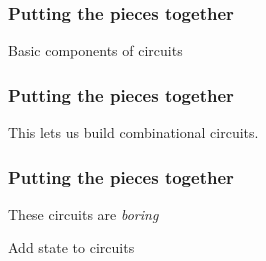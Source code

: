 \begin{frame}
    \frametitle{Putting the pieces together}

    Basic components of circuits

\end{frame}
\begin{frame}
    \frametitle{Putting the pieces together}

    \centering
    This lets us build \alert{combinational} circuits.

\end{frame}
\begin{frame}
    \frametitle{Putting the pieces together}

    \centering
    These circuits are \emph{boring}

    Add state to circuits

\end{frame}